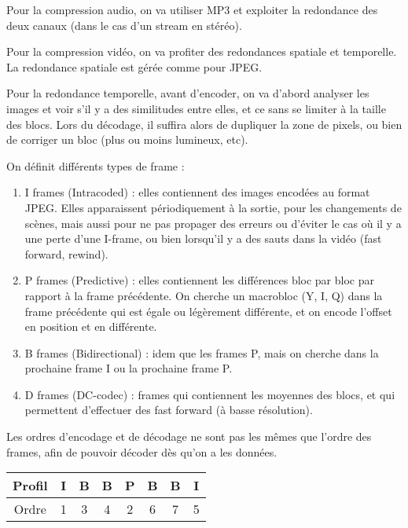 		
			Pour la compression audio, on va utiliser MP3 et exploiter la redondance des deux canaux (dans le cas d'un stream en stéréo).
		
			Pour la compression vidéo, on va profiter des redondances spatiale et temporelle. La redondance spatiale est gérée comme pour JPEG.
		
			Pour la redondance temporelle, avant d'encoder, on va d'abord analyser les images et voir s'il y a des similitudes entre elles, et ce sans se limiter à la taille des blocs. Lors du décodage, il suffira alors de dupliquer la zone de pixels, ou bien de corriger un bloc (plus ou moins lumineux, etc).
		
			On définit différents types de frame :%
		
			\begin{enumerate}
				\item I frames (Intracoded) : elles contiennent des images encodées au format JPEG. Elles apparaissent périodiquement à la sortie, pour les changements de scènes, mais aussi pour ne pas propager des erreurs ou d'éviter le cas où il y a une perte d'une I-frame, ou bien lorsqu'il y a des sauts dans la vidéo (fast forward, rewind).
			
				\item P frames (Predictive) : elles contiennent les différences bloc par bloc par rapport à la frame précédente. On cherche un macrobloc (Y, I, Q) dans la frame précédente qui est égale ou légèrement différente, et on encode l'offset en position et en différente.
			
				\item B frames (Bidirectional) : idem que les frames P, mais on cherche dans la prochaine frame I ou la prochaine frame P.
			
				\item D frames (DC-codec) : frames qui contiennent les moyennes des blocs, et qui permettent d'effectuer des fast forward (à basse résolution).
			\end{enumerate}	
			
		
			Les ordres d'encodage et de décodage ne sont pas les mêmes que l'ordre des frames, afin de pouvoir décoder dès qu'on a les données.
		
\begin{center}
\begin{tabular}{|c|c|c|c|c|c|c|c|}
\hline 
Profil & I & B & B & P & B & B & I \\ 
\hline 
Ordre & 1 & 3 & 4 & 2 & 6 & 7 & 5 \\ 
\hline 
\end{tabular}
\end{center} 
		
